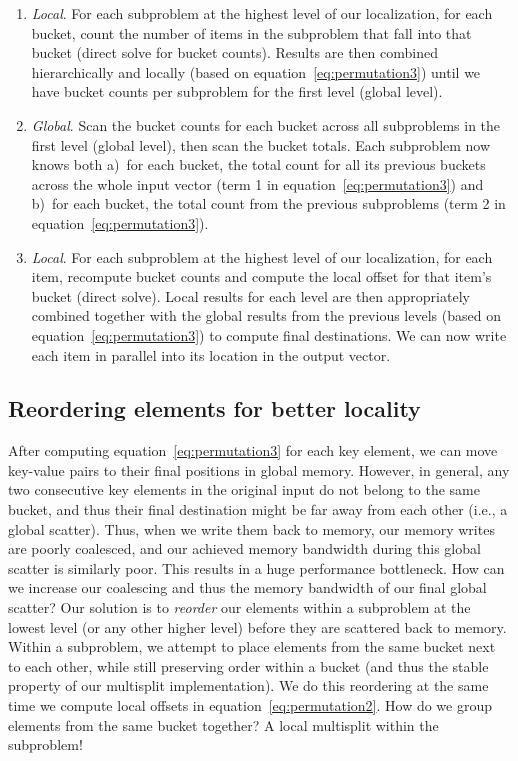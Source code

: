\begin{enumerate}
\item \emph{Local}. For each subproblem at the highest level of our localization, for each bucket, count the number of items in the subproblem that fall into that bucket (direct solve for bucket counts).
Results are then combined hierarchically and locally (based on equation~\eqref{eq:permutation3}) until we have bucket counts per subproblem for the first level (global level).
\item \emph{Global}. Scan the bucket counts for each bucket across all subproblems in the first level (global level), then scan the bucket totals. Each subproblem now knows both a)~for each bucket, the total count for all its previous buckets across the whole input vector (term 1 in equation~\eqref{eq:permutation3}) and b)~for each bucket, the total count from the previous subproblems  (term 2 in equation~\eqref{eq:permutation3}).
\item \emph{Local}. For each subproblem at the highest level of our localization, for each item, recompute bucket counts and compute the local offset for that item's bucket (direct solve).
Local results for each level are then appropriately combined together with the global results from the previous levels (based on equation~\eqref{eq:permutation3}) to compute final destinations.
We can now write each item in parallel into its location in the output vector.
\end{enumerate}

\subsection{Reordering elements for better locality}\label{subsec:alg_reordering}
After computing equation~\eqref{eq:permutation3} for each key element, we can move key-value pairs to their final positions in global memory. However, in general, any two consecutive key elements in the original input do not belong to the same bucket, and thus their final destination might be far away from each other (i.e., a global scatter).
Thus, when we write them back to memory, our memory writes are poorly coalesced, and our achieved memory bandwidth during this global scatter is similarly poor. This results in a huge performance bottleneck. How can we increase our coalescing and thus the memory bandwidth of our final global scatter?
Our solution is to \emph{reorder} our elements within a subproblem at the lowest level (or any other higher level) before they are scattered back to memory.
Within a subproblem, we attempt to place elements from the same bucket next to each other, while still preserving order within a bucket (and thus the stable property of our multisplit implementation). We do this reordering at the same time we compute local offsets in equation~\eqref{eq:permutation2}. How do we group elements from the same bucket together? A local multisplit within the subproblem!

